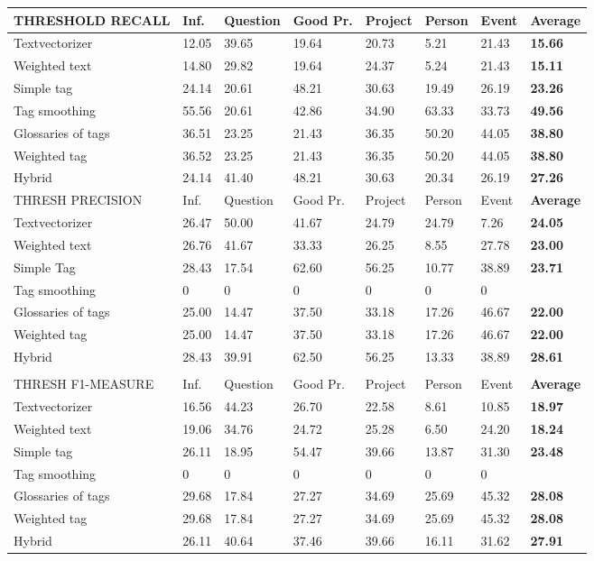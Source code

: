 \begin{table}
\begin{tabular}{| l | l | l | l | l | l | l | l |}
\hline
THRESHOLD RECALL & Inf. &  Question &  Good Pr.& Project & Person &  Event & {\bf Average} \\
\hline
Textvectorizer & 12.05 & 39.65 & 19.64 & 20.73 & 5.21 & 21.43 & {\bf 15.66}\\
Weighted text & 14.80 & 29.82 & 19.64 & 24.37 & 5.24 & 21.43 & {\bf 15.11}\\
Simple tag & 24.14 & 20.61 & 48.21 & 30.63 & 19.49 & 26.19 & {\bf 23.26}\\
Tag smoothing & 55.56 & 20.61 & 42.86 & 34.90 & 63.33 & 33.73 & {\bf 49.56}\\
Glossaries of tags & 36.51 & 23.25 & 21.43 & 36.35 & 50.20 & 44.05 & {\bf 38.80}\\
Weighted tag & 36.52 & 23.25 & 21.43 & 36.35 & 50.20 & 44.05 & {\bf 38.80}\\
Hybrid & 24.14 & 41.40 & 48.21 & 30.63 & 20.34 & 26.19 & {\bf 27.26}\\
\hline

\hline
THRESH PRECISION & Inf. &  Question &  Good Pr.& Project & Person &  Event & {\bf Average} \\
\hline
Textvectorizer & 26.47 & 50.00 & 41.67 & 24.79 & 24.79 & 7.26 & {\bf 24.05}\\
Weighted text & 26.76 & 41.67 & 33.33 & 26.25 & 8.55 & 27.78 & {\bf 23.00}\\
Simple Tag & 28.43 & 17.54 & 62.60 & 56.25 & 10.77 & 38.89 & {\bf 23.71}\\
Tag smoothing &  0 & 0 & 0& 0 & 0 & 0 &{\bf } \\
Glossaries of tags & 25.00 & 14.47 & 37.50 & 33.18 & 17.26 & 46.67 & {\bf 22.00}\\
Weighted tag & 25.00 & 14.47 & 37.50 & 33.18 & 17.26 & 46.67 & {\bf 22.00}\\
Hybrid & 28.43 & 39.91 & 62.50 & 56.25 & 13.33 & 38.89 & {\bf 28.61}\\
\hline
\\
\hline
THRESH F1-MEASURE & Inf. &  Question &  Good Pr.& Project & Person &  Event & {\bf Average} \\
\hline
Textvectorizer & 16.56 & 44.23 & 26.70 & 22.58 & 8.61 & 10.85 & {\bf 18.97 } \\
Weighted text & 19.06 & 34.76 & 24.72 & 25.28 & 6.50 & 24.20 & {\bf 18.24 } \\
Simple tag & 26.11 & 18.95 & 54.47 & 39.66 & 13.87 & 31.30 & {\bf 23.48} \\
Tag smoothing & 0 & 0 & 0& 0 & 0 & 0 &{\bf } \\
Glossaries of tags & 29.68 & 17.84 & 27.27 & 34.69 & 25.69 & 45.32 &{\bf 28.08} \\
Weighted tag & 29.68 & 17.84 & 27.27 & 34.69 & 25.69 & 45.32 &{\bf 28.08 } \\
Hybrid &  26.11 & 40.64 & 37.46 & 39.66 & 16.11 & 31.62 &{\bf 27.91} \\
\hline
\end{tabular}


\end{table}
